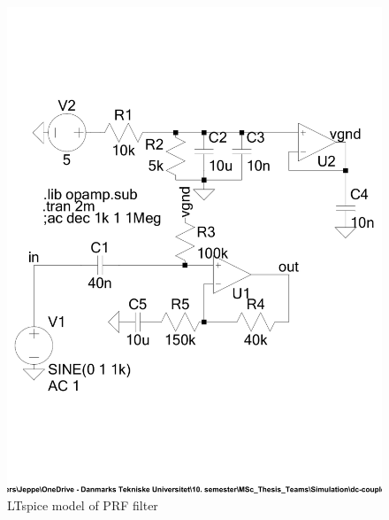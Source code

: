 \begin{figure}[htbp]
	\centering
	\includegraphics[width=.9\textwidth]{Figures/appendix/ltspice_dccoupler.pdf}
	\caption{LTspice model of PRF filter}
	\label{fig:app_ltspice_dc_coupler}
\end{figure}




